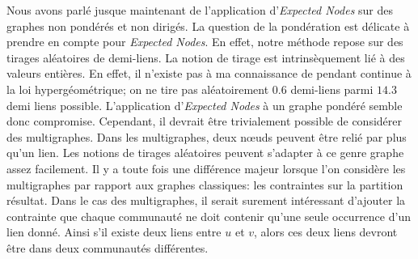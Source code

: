Nous avons parlé jusque maintenant de l'application d'\emph{Expected Nodes} sur des graphes non pondérés et non dirigés.
La question de la pondération est délicate à prendre en compte pour \emph{Expected Nodes}.
En effet, notre méthode repose sur des tirages aléatoires de demi-liens.
La notion de tirage est intrinsèquement lié à des valeurs entières.
En effet, il n'existe pas à ma connaissance de pendant continue à la loi hypergéométrique;
on ne tire pas aléatoirement $0.6$ demi-liens parmi $14.3$ demi liens possible.
L'application d'\emph{Expected Nodes} à un graphe pondéré semble donc compromise.
Cependant, il devrait être trivialement possible de considérer des multigraphes.
Dans les multigraphes, deux n\oe uds peuvent être relié par plus qu'un lien.
Les notions de tirages aléatoires peuvent s'adapter à ce genre graphe assez facilement.
Il y a toute fois une différence majeur lorsque l'on considère les multigraphes par rapport aux graphes classiques: les contraintes sur la partition résultat.
Dans le cas des multigraphes, il serait surement intéressant d'ajouter la contrainte que chaque communauté ne doit contenir qu'une seule occurrence d'un lien donné.
Ainsi s'il existe deux liens entre $u$ et $v$, alors ces deux liens devront être dans deux communautés différentes.
